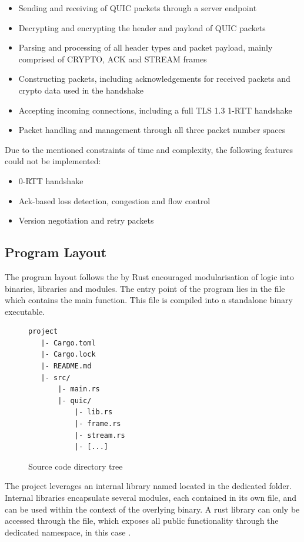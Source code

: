 \begin{itemize}
    \item Sending and receiving of QUIC packets through a server endpoint
    \item Decrypting and encrypting the header and payload of QUIC packets
    \item Parsing and processing of all header types and packet payload, mainly comprised of CRYPTO, ACK and STREAM frames
    \item Constructing packets, including acknowledgements for received packets and crypto data used in the handshake
    \item Accepting incoming connections, including a full TLS 1.3 1-RTT handshake
    \item Packet handling and management through all three packet number spaces
\end{itemize}

Due to the mentioned constraints of time and complexity, the following features could not be implemented:
\begin{itemize}
    \item 0-RTT handshake
    \item Ack-based loss detection, congestion and flow control
    \item Version negotiation and retry packets
\end{itemize} 

\subsection{Program Layout}

The program layout follows the by Rust encouraged modularisation of logic into binaries, libraries and modules. The entry point of the program lies in the  file which contains the main function. This file is compiled into a standalone binary executable.

\begin{figure}[htb]
    \centering
\begin{verbatim}
project
   |- Cargo.toml
   |- Cargo.lock
   |- README.md
   |- src/
       |- main.rs
       |- quic/
           |- lib.rs
           |- frame.rs
           |- stream.rs
           |- [...]
\end{verbatim}
    \caption{Source code directory tree}
    \label{source_code_tree}
\end{figure}

The project leverages an internal library named  located in the dedicated  folder. Internal libraries encapsulate several modules, each contained in its own file, and can be used within the context of the overlying binary. A rust library can only be accessed through the  file, which exposes all public functionality through the dedicated namespace, in this case . 

